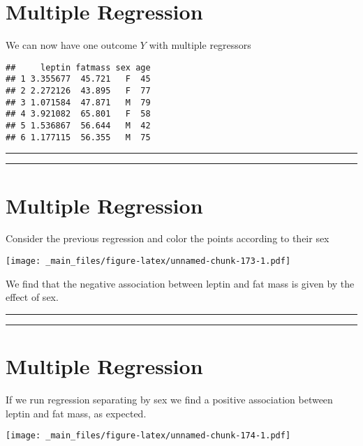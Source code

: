 \documentclass[
]{book}
\begin{document}
\hypertarget{multiple-regression-1}{%
\section{Multiple Regression}\label{multiple-regression-1}}

We can now have one outcome \(Y\) with multiple regressors

\begin{verbatim}
##     leptin fatmass sex age
## 1 3.355677  45.721   F  45
## 2 2.272126  43.895   F  77
## 3 1.071584  47.871   M  79
## 4 3.921082  65.801   F  58
## 5 1.536867  56.644   M  42
## 6 1.177115  56.355   M  75
\end{verbatim}

\begin{center}\rule{0.5\linewidth}{0.5pt}\end{center}

\begin{center}\rule{0.5\linewidth}{0.5pt}\end{center}

\hypertarget{multiple-regression-2}{%
\section{Multiple Regression}\label{multiple-regression-2}}

Consider the previous regression and color the points according to their sex

\texttt{[image: \_main\_files/figure-latex/unnamed-chunk-173-1.pdf]}

We find that the negative association between leptin and fat mass is given by the effect of sex.

\begin{center}\rule{0.5\linewidth}{0.5pt}\end{center}

\begin{center}\rule{0.5\linewidth}{0.5pt}\end{center}

\hypertarget{multiple-regression-3}{%
\section{Multiple Regression}\label{multiple-regression-3}}

If we run regression separating by sex we find a positive association between leptin and fat mass, as expected.

\texttt{[image: \_main\_files/figure-latex/unnamed-chunk-174-1.pdf]}
\end{document}
